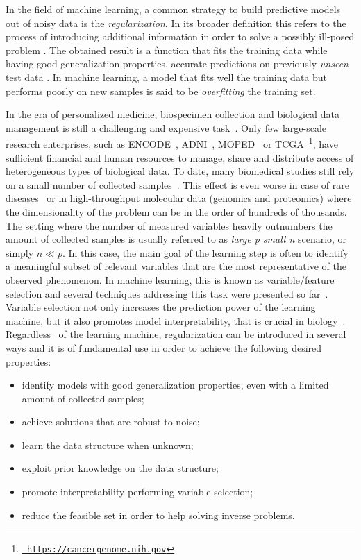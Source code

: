 In the field of machine learning, a common strategy to build predictive models out of noisy data is the \textit{regularization}.
In its broader definition this refers to the process of introducing additional information in order to solve a possibly ill-posed
problem \cite{tikhonov1963solution, evgeniou2000regularization}. The obtained result is a function that fits the training data while having good generalization properties, \ie accurate predictions on previously  \textit{unseen} test data \cite{hastie2009elements}. In machine learning, a model that fits well the training data but performs poorly on new samples is said to be \textit{overfitting} the training set.

In the era of personalized medicine, biospecimen collection and biological data management is still a challenging and expensive task~\cite{toga2015sharing}. Only few large-scale research enterprises, such as ENCODE~\cite{encode2004encode},  ADNI~\cite{jack2008alzheimer},  MOPED~\cite{kolker2012moped} or TCGA~\footnote{\href{https://cancergenome.nih.gov}{\texttt{ \small https://cancergenome.nih.gov}}}, have sufficient financial and human resources to manage, share and distribute access of heterogeneous types of biological data. To date, many biomedical studies still rely on a small number of collected samples~\cite{mcneish2016effect, button2013power, yu2013shrinkage}. This effect is even worse in case of rare diseases~\cite{Garg2016ABM} or in high-throughput molecular data (\eg genomics and proteomics) where the dimensionality of the problem can be in the order of hundreds of thousands.
%
The setting where the number of measured variables heavily outnumbers the amount of collected samples is usually referred to as \textit{large p small n} scenario, or simply $n \ll p$. In this case, the main goal of the learning step is often to identify a meaningful subset of relevant variables that are the most representative of the observed phenomenon. In machine learning, this is known as variable/feature selection and several techniques addressing this task were presented so far~\cite{guyon2002gene}. Variable selection not only increases the prediction power of the learning machine, but it also promotes model interpretability, that is crucial in biology~\cite{altmann2010permutation}.
%
Regardless~\citep{okser2014regularized} of the learning machine, regularization can be introduced in several ways and it is of fundamental use in order to achieve the following desired properties:
%
\begin{itemize}
	\item identify models with good generalization properties, even with a limited amount of collected samples;
	\item achieve solutions that are robust to noise;
	\item learn the data structure when unknown;
	\item exploit prior knowledge on the data structure;
	\item promote interpretability performing variable selection;
	\item reduce the feasible set in order to help solving inverse problems. %
\end{itemize}
